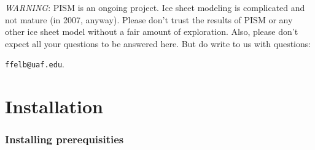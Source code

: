 \documentclass[11pt,final]{amsart}
\begin{document}
\vspace{1.5in}
\large
\begin{center}
 \emph{WARNING}:  PISM is an ongoing project.  Ice sheet modeling is complicated and not mature (in 2007, anyway).  Please don't trust the results of PISM or any other ice sheet model without a fair amount of exploration.  Also, please don't expect all your questions to be answered here.  But do write to us with questions: 

\verb|ffelb@uaf.edu|.
\end{center}
\normalsize

\newpage
\section{Installation}\label{sect:install}

\subsubsection*{Installing prerequisities}
\renewcommand{\labelenumi}{\textbf{\arabic{enumi}.}~}
\end{document}
